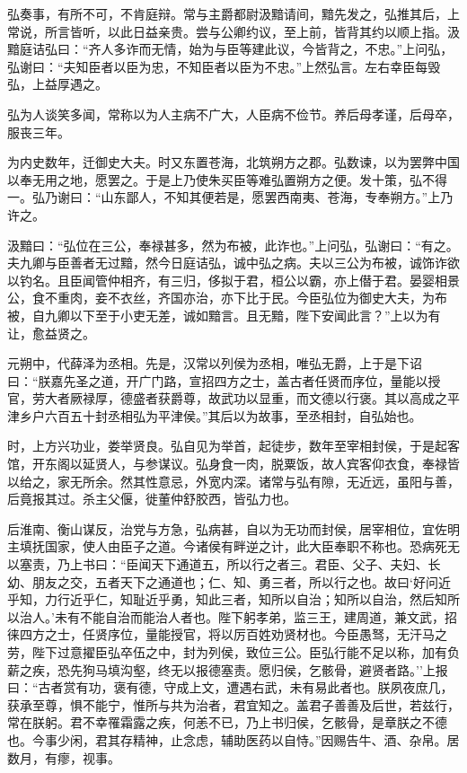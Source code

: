 \documentclass[]{article}
\begin{document}
弘奏事，有所不可，不肯庭辩。常与主爵都尉汲黯请间，黯先发之，弘推其后，上常说，所言皆听，以此日益亲贵。尝与公卿约议，至上前，皆背其约以顺上指。汲黯庭诘弘曰：``齐人多诈而无情，始为与臣等建此议，今皆背之，不忠。''上问弘，弘谢曰：``夫知臣者以臣为忠，不知臣者以臣为不忠。''上然弘言。左右幸臣每毁弘，上益厚遇之。

弘为人谈笑多闻，常称以为人主病不广大，人臣病不俭节。养后母孝谨，后母卒，服丧三年。

为内史数年，迁御史大夫。时又东置苍海，北筑朔方之郡。弘数谏，以为罢弊中国以奉无用之地，愿罢之。于是上乃使朱买臣等难弘置朔方之便。发十策，弘不得一。弘乃谢曰：``山东鄙人，不知其便若是，愿罢西南夷、苍海，专奉朔方。''上乃许之。

汲黯曰：``弘位在三公，奉禄甚多，然为布被，此诈也。''上问弘，弘谢曰：``有之。夫九卿与臣善者无过黯，然今日庭诘弘，诚中弘之病。夫以三公为布被，诚饰诈欲以钓名。且臣闻管仲相齐，有三归，侈拟于君，桓公以霸，亦上僣于君。晏婴相景公，食不重肉，妾不衣丝，齐国亦治，亦下比于民。今臣弘位为御史大夫，为布被，自九卿以下至于小吏无差，诚如黯言。且无黯，陛下安闻此言？''上以为有让，愈益贤之。

元朔中，代薛泽为丞相。先是，汉常以列侯为丞相，唯弘无爵，上于是下诏曰：``朕嘉先圣之道，开广门路，宣招四方之士，盖古者任贤而序位，量能以授官，劳大者厥禄厚，德盛者获爵尊，故武功以显重，而文德以行褒。其以高成之平津乡户六百五十封丞相弘为平津侯。''其后以为故事，至丞相封，自弘始也。

时，上方兴功业，娄举贤良。弘自见为举首，起徒步，数年至宰相封侯，于是起客馆，开东阁以延贤人，与参谋议。弘身食一肉，脱粟饭，故人宾客仰衣食，奉禄皆以给之，家无所余。然其性意忌，外宽内深。诸常与弘有隙，无近远，虽阳与善，后竟报其过。杀主父偃，徙董仲舒胶西，皆弘力也。

后淮南、衡山谋反，治党与方急，弘病甚，自以为无功而封侯，居宰相位，宜佐明主填抚国家，使人由臣子之道。今诸侯有畔逆之计，此大臣奉职不称也。恐病死无以塞责，乃上书曰：``臣闻天下通道五，所以行之者三。君臣、父子、夫妇、长幼、朋友之交，五者天下之通道也；仁、知、勇三者，所以行之也。故曰`好问近乎知，力行近乎仁，知耻近乎勇，知此三者，知所以自治；知所以自治，然后知所以治人。'未有不能自治而能治人者也。陛下躬孝弟，监三王，建周道，兼文武，招徕四方之士，任贤序位，量能授官，将以厉百姓劝贤材也。今臣愚驽，无汗马之劳，陛下过意擢臣弘卒伍之中，封为列侯，致位三公。臣弘行能不足以称，加有负薪之疾，恐先狗马填沟壑，终无以报德塞责。愿归侯，乞骸骨，避贤者路。''上报曰：``古者赏有功，褒有德，守成上文，遭遇右武，未有易此者也。朕夙夜庶几，获承至尊，惧不能宁，惟所与共为治者，君宜知之。盖君子善善及后世，若兹行，常在朕躬。君不幸罹霜露之疾，何恙不已，乃上书归侯，乞骸骨，是章朕之不德也。今事少闲，君其存精神，止念虑，辅助医药以自恃。''因赐告牛、酒、杂帛。居数月，有瘳，视事。
\end{document}
